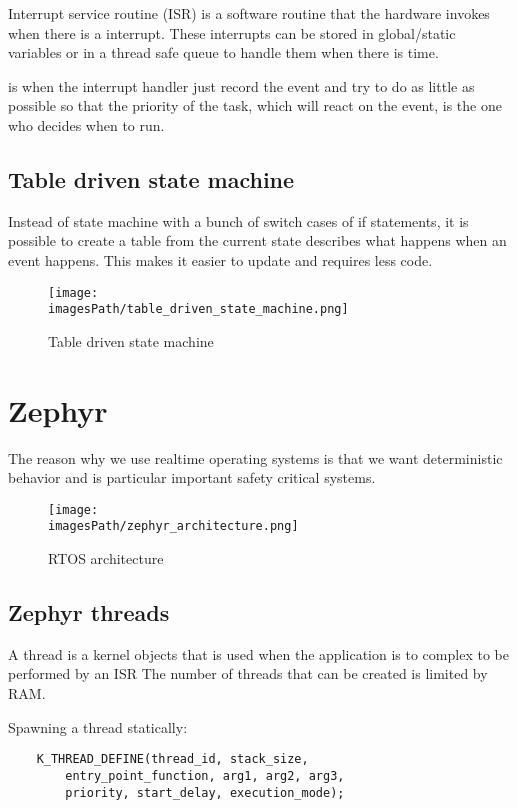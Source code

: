Interrupt service routine (ISR) is a software routine that the hardware invokes when there is a interrupt.
These interrupts can be stored in global/static variables or in a thread safe queue to handle 
them when there is time.

 is when the interrupt handler just record
the event and try to do as little as possible so that the priority of the task, 
which will react on the event, is the one who decides when to run.

\subsection{Table driven state machine}
Instead of state machine with a bunch of switch cases of if statements, it is possible to create a table
from the current state describes what happens when an event happens. This makes it easier to update and requires less code.
\begin{figure}[H]
    \centering
    \texttt{[image: \\imagesPath/table\_driven\_state\_machine.png]}
    \caption{Table driven state machine}
    \label{fig:table_driven_state_machine}
\end{figure}


\section{Zephyr}
The reason why we use realtime operating systems is that 
we want deterministic behavior and is particular important 
safety critical systems.

\begin{figure}[H]
    \centering
    \texttt{[image: \\imagesPath/zephyr\_architecture.png]}
    \caption{RTOS architecture}
    \label{fig:rtos_architecture}
\end{figure}

\subsection{Zephyr threads}
A thread is a kernel objects that is used when the application is to 
complex to be performed by an ISR
The number of threads that can be created is limited by RAM.

Spawning a thread statically:
\begin{verbatim}
    K_THREAD_DEFINE(thread_id, stack_size, 
        entry_point_function, arg1, arg2, arg3,
        priority, start_delay, execution_mode);
\end{verbatim}

